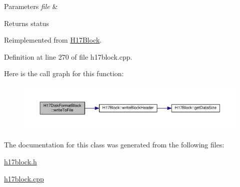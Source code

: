 \begin{DoxyParams}{Parameters}
{\em file} & \\
\hline
\end{DoxyParams}
\begin{DoxyReturn}{Returns}
status 
\end{DoxyReturn}


Reimplemented from \hyperlink{classH17Block_a59901675cd140c907fb6de4c8e0452d5}{H17\+Block}.



Definition at line 270 of file h17block.\+cpp.



Here is the call graph for this function\+:\nopagebreak
\begin{figure}[H]
\begin{center}
\leavevmode
\includegraphics[width=350pt]{classH17DiskFormatBlock_af49df48b3a9626b2dab1731fd366ee8f_cgraph}
\end{center}
\end{figure}




The documentation for this class was generated from the following files\+:\begin{DoxyCompactItemize}
\item 
\hyperlink{h17block_8h}{h17block.\+h}\item 
\hyperlink{h17block_8cpp}{h17block.\+cpp}\end{DoxyCompactItemize}
